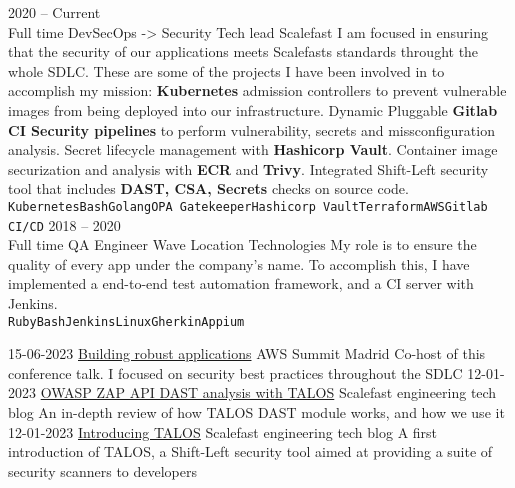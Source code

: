 \documentclass[9pt]{developercv} %
\begin{document}
\begin{entrylist}
	\entry
		{2020 -- Current\\\footnotesize{Full time}}
		{DevSecOps -> Security Tech lead}
		{Scalefast}
		{I am focused in ensuring that the security of our applications meets Scalefasts standards throught the whole SDLC.
		These are some of the projects I have been involved in to accomplish my mission:
		\textbf{Kubernetes} admission controllers to prevent vulnerable images from being deployed into our infrastructure.
		Dynamic Pluggable \textbf{Gitlab CI Security pipelines} to perform vulnerability, secrets and missconfiguration analysis.
		Secret lifecycle management with \textbf{Hashicorp Vault}.
		Container image securization and analysis with \textbf{ECR} and \textbf{Trivy}.
		Integrated Shift-Left security tool that includes \textbf{DAST, CSA, Secrets} checks on source code.
		\\ \texttt{Kubernetes}\slashsep\texttt{Bash}\slashsep\texttt{Golang}\slashsep\texttt{OPA Gatekeeper}\slashsep\texttt{Hashicorp Vault}\slashsep\texttt{Terraform}\slashsep\texttt{AWS}\slashsep\texttt{Gitlab CI/CD}}
	\entry
		{2018 -- 2020\\\footnotesize{Full time}}
		{QA Engineer}
		{Wave Location Technologies}
		{My role is to ensure the quality of every app under the company's name.
		To accomplish this, I have implemented a end-to-end test automation framework, and a CI server with Jenkins.\\ \texttt{Ruby}\slashsep\texttt{Bash}\slashsep\texttt{Jenkins}\slashsep\texttt{Linux}\slashsep\texttt{Gherkin}\slashsep\texttt{Appium}}
\end{entrylist}


\begin{entrylist}
	\entry
	  {15-06-2023}
	  {\href{https://play.vidyard.com/uvjJ6wyme9XUcCjY6U2pTN}{Building robust applications}}
    	  {AWS Summit Madrid}
    	  {Co-host of this conference talk. I focused on security best practices throughout the SDLC}
	\entry
	  {12-01-2023}
	  {\href{https://scalefast.engineering/owasp-zap-api-dast-analysis-with-talos-523c63b860a0}{OWASP ZAP API DAST analysis with TALOS}}
          {Scalefast engineering tech blog}
          {An in-depth review of how TALOS DAST module works, and how we use it}
	\entry
	  {12-01-2023}
	  {\href{https://scalefast.engineering/introducing-talos-fd12c450b48}{Introducing TALOS}}
          {Scalefast engineering tech blog}
          {A first introduction of TALOS, a Shift-Left security tool aimed at providing a suite of security scanners to developers}
\end{entrylist}
\end{document}
